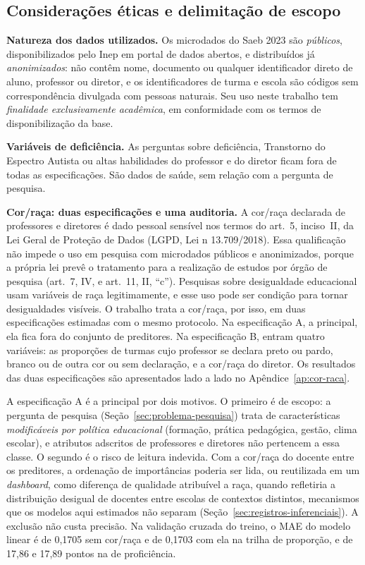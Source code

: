 \subsection{Considerações éticas e delimitação de escopo}
\label{sec:etica}

\textbf{Natureza dos dados utilizados.} Os microdados do Saeb 2023 são
\emph{públicos}, disponibilizados pelo Inep em portal de dados abertos, e
distribuídos já \emph{anonimizados}: não contêm nome, documento ou qualquer
identificador direto de aluno, professor ou diretor, e os identificadores de
turma e escola são códigos sem correspondência divulgada com pessoas
naturais. Seu uso neste trabalho tem \emph{finalidade exclusivamente
acadêmica}, em conformidade com os termos de disponibilização da base.

\textbf{Variáveis de deficiência.} As perguntas sobre deficiência,
Transtorno do Espectro Autista ou altas habilidades do professor e do
diretor ficam fora de todas as especificações. São dados de saúde, sem
relação com a pergunta de pesquisa.

\textbf{Cor/raça: duas especificações e uma auditoria.} A cor/raça declarada de
professores e diretores é dado pessoal sensível nos termos do
art.~5\textordmasculine{}, inciso~II, da Lei Geral de Proteção de Dados
(LGPD, Lei n\textordmasculine{} 13.709/2018). Essa qualificação não impede
o uso em pesquisa com microdados públicos e anonimizados, porque a própria
lei prevê o tratamento para a realização de estudos por órgão de pesquisa
(art.~7\textordmasculine{}, IV, e art.~11, II, ``c''). Pesquisas sobre
desigualdade educacional usam variáveis de raça legitimamente, e esse uso
pode ser condição para tornar desigualdades visíveis. O trabalho trata a
cor/raça, por isso, em duas especificações estimadas com o mesmo protocolo. Na
especificação A, a principal, ela fica fora do conjunto de preditores. Na especificação
B, entram quatro variáveis: as proporções de turmas cujo professor se
declara preto ou pardo, branco ou de outra cor ou sem declaração, e a
cor/raça do diretor. Os resultados das duas especificações são apresentados lado
a lado no Apêndice~\ref{ap:cor-raca}.

A especificação A é a principal por dois motivos. O primeiro é de escopo: a
pergunta de pesquisa (Seção~\ref{sec:problema-pesquisa}) trata de
características \emph{modificáveis por política educacional} (formação,
prática pedagógica, gestão, clima escolar), e atributos adscritos de
professores e diretores não pertencem a essa classe. O segundo é o risco de
leitura indevida. Com a cor/raça do docente entre os preditores, a
ordenação de importâncias poderia ser lida, ou reutilizada em um
\textit{dashboard}, como diferença de qualidade atribuível a raça, quando
refletiria a distribuição desigual de docentes entre escolas de contextos
distintos, mecanismos que os modelos aqui estimados não separam
(Seção~\ref{sec:registros-inferenciais}). A exclusão não custa precisão. Na
validação cruzada do treino, o MAE do modelo linear é de 0,1705 sem
cor/raça e de 0,1703 com ela na trilha de proporção, e de 17,86 e 17,89
pontos na de proficiência.

